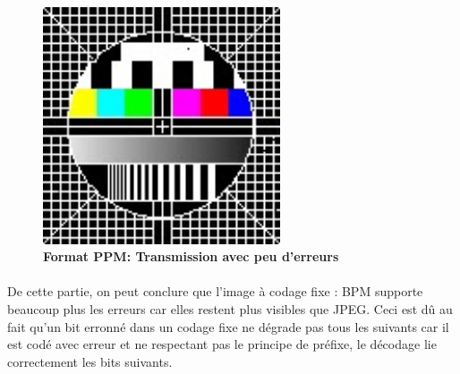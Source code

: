 \begin{figure}[bth]%
\begin{center}
\includegraphics[height=70mm,width=70mm]{BMP_test_bruit63dB}%
\caption{\textbf{Format PPM: Transmission avec peu d’erreurs}}%
\label{BMP_test_bruit63dB}%
\end {center}
\end{figure}

\paragraph{}

\paragraph{}
De cette partie, on peut conclure que l'image à codage fixe : BPM supporte beaucoup plus les erreurs car elles restent plus visibles que JPEG. Ceci est dû au fait qu'un bit erronné dans un codage fixe ne dégrade pas tous les suivants car il est codé avec erreur et ne respectant pas le principe de préfixe, le décodage lie correctement les bits suivants. 
